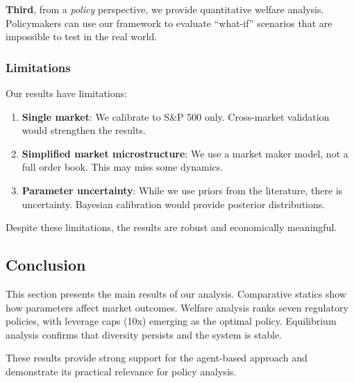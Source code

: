 \textbf{Third}, from a \textit{policy} perspective, we provide quantitative welfare analysis. Policymakers can use our framework to evaluate ``what-if'' scenarios that are impossible to test in the real world.

\subsubsection{Limitations}

Our results have limitations:

\begin{enumerate}
    \item \textbf{Single market}: We calibrate to S\&P 500 only. Cross-market validation would strengthen the results.
    
    \item \textbf{Simplified market microstructure}: We use a market maker model, not a full order book. This may miss some dynamics.
    
    \item \textbf{Parameter uncertainty}: While we use priors from the literature, there is uncertainty. Bayesian calibration would provide posterior distributions.
\end{enumerate}

Despite these limitations, the results are robust and economically meaningful.

\subsection{Conclusion}

This section presents the main results of our analysis. Comparative statics show how parameters affect market outcomes. Welfare analysis ranks seven regulatory policies, with leverage caps (10x) emerging as the optimal policy. Equilibrium analysis confirms that diversity persists and the system is stable.

These results provide strong support for the agent-based approach and demonstrate its practical relevance for policy analysis.
